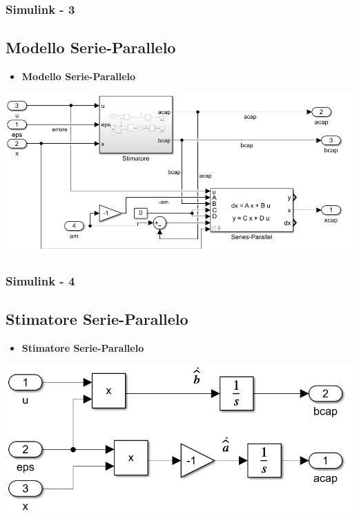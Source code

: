 \documentclass{beamer}
\begin{document}
\begin{frame}
    \frametitle{Simulink - 3}
    \subsection{Modello Serie-Parallelo}
    \begin{itemize}
        \item \textbf{Modello Serie-Parallelo}
    \end{itemize}
    \begin{center}
        \includegraphics[scale=0.3]{ModelloSerieParallelo.jpg}%
    \end{center}
\end{frame}
\begin{frame}
    \frametitle{Simulink - 4}
    \subsection{Stimatore Serie-Parallelo}
    \begin{itemize}
        \item \textbf{Stimatore Serie-Parallelo}
    \end{itemize}
    \begin{center}
        \includegraphics[scale=0.3]{StimatoreSerieParallelo.jpg}%
    \end{center}
\end{frame}
\end{document}

